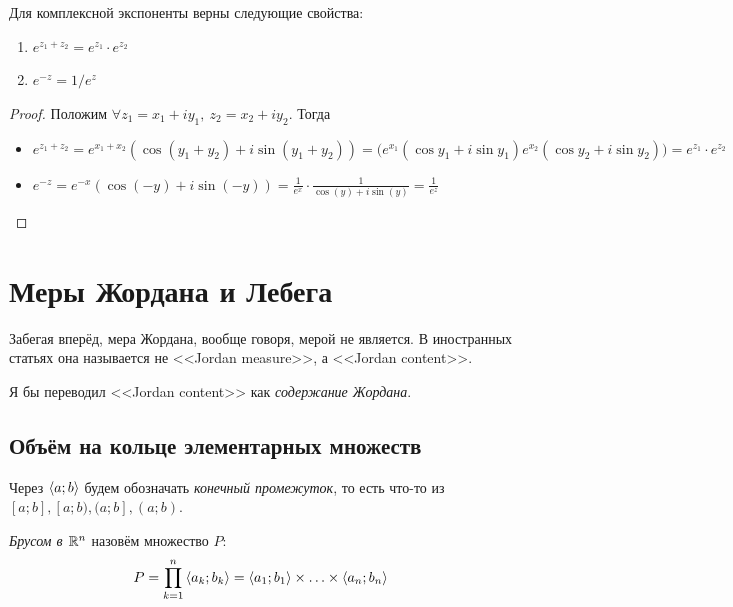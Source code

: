 \begin{proposition}
	Для комплексной экспоненты верны следующие свойства:
	\begin{enumerate}
		\item \(e^{z_1 + z_2} = e^{z_1} \cdot e^{z_2}\)
		
		\item \(e^{-z} = 1 / e^z\)
	\end{enumerate}
\end{proposition}

\begin{proof}
	Положим $\forall z_1 = x_1 + iy_1,\ z_2 = x_2 + iy_2$. Тогда
	\begin{itemize}
		\item \(e^{z_1 + z_2} = e^{x_1 + x_2} (\cos(y_1 + y_2) + i\sin(y_1 + y_2)) = \big(e^{x_1}(\cos y_1 + i\sin y_1)e^{x_2}(\cos y_2 + i\sin y_2)\big) = e^{z_1} \cdot e^{z_2}\)
		
		\item \(e^{-z} = e^{-x}(\cos(-y) + i\sin(-y)) = \frac{1}{e^x} \cdot \frac{1}{\cos(y) + i\sin(y)} = \frac{1}{e^z}\)
	\end{itemize}
\end{proof}

\section{Меры Жордана и Лебега}

\begin{note}
	Забегая вперёд, мера Жордана, вообще говоря, мерой не является. В иностранных статьях она называется не <<Jordan measure>>, а <<Jordan content>>.
\end{note}

\begin{anote}
	Я бы переводил <<Jordan content>> как \textit{содержание Жордана}.
\end{anote}

\subsection{Объём на кольце элементарных множеств}

\begin{note}
	Через $\left\langle a; b\right\rangle$ будем обозначать \textit{конечный промежуток}, то есть что-то из $[a; b], [a; b), (a; b], (a; b)$.
\end{note}

\begin{definition}
	\textit{Брусом в $\mathbb{R}^n$} назовём множество $P$:
	\[
		P = \prod\limits_{k = 1}^n \left\langle a_k; b_k\right\rangle = \left\langle a_1; b_1\right\rangle \times \ldots \times \left\langle a_n; b_n\right\rangle
	\]
\end{definition}

